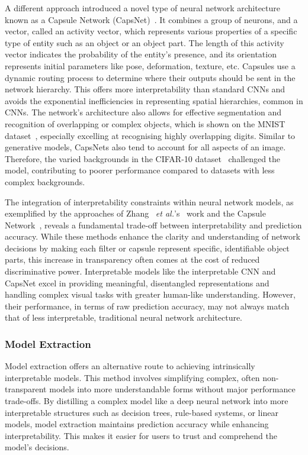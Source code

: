A different approach introduced a novel type of neural network architecture known as a Capsule Network (CapsNet)~\cite{SabourFH17}. It combines a group of neurons, and a vector, called an activity vector, which represents various properties of a specific type of entity such as an object or an object part. The length of this activity vector indicates the probability of the entity's presence, and its orientation represents initial parameters like pose, deformation, texture, etc. Capsules use a dynamic routing process to determine where their outputs should be sent in the network hierarchy. This offers more interpretability than standard CNNs and avoids the exponential inefficiencies in representing spatial hierarchies, common in CNNs. The network's architecture also allows for effective segmentation and recognition of overlapping or complex objects, which is shown on the MNIST dataset~\cite{deng2012mnist}, especially excelling at recognising highly overlapping digits. Similar to generative models, CapsNets also tend to account for all aspects of an image. Therefore, the varied backgrounds in the CIFAR-10 dataset~\cite{cifar} challenged the model, contributing to poorer performance compared to datasets with less complex backgrounds.


The integration of interpretability constraints within neural network models, as exemplified by the approaches of Zhang ~\textit{et al.}'s~\cite{ZhangWZ18a} work and the Capsule Network~\cite{SabourFH17}, reveals a fundamental trade-off between interpretability and prediction accuracy. While these methods enhance the clarity and understanding of network decisions by making each filter or capsule represent specific, identifiable object parts, this increase in transparency often comes at the cost of reduced discriminative power. Interpretable models like the interpretable CNN and CapsNet excel in providing meaningful, disentangled representations and handling complex visual tasks with greater human-like understanding. However, their performance, in terms of raw prediction accuracy, may not always match that of less interpretable, traditional neural network architecture.

\subsubsection{Model Extraction}
\label{sec:extraction}

Model extraction offers an alternative route to achieving intrinsically interpretable models. This method involves simplifying complex, often non-transparent models into more understandable forms without major performance trade-offs. By distilling a complex model like a deep neural network into more interpretable structures such as decision trees, rule-based systems, or linear models, model extraction maintains prediction accuracy while enhancing interpretability. This makes it easier for users to trust and comprehend the model's decisions.

